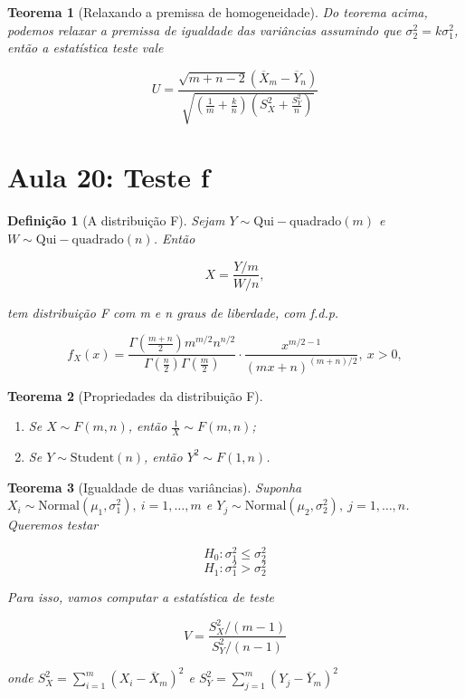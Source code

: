 \documentclass{article}
\newtheorem{theorem}{Teorema}
\newtheorem{definition}{Definição}
\begin{document}
\begin{theorem}[Relaxando a premissa de homogeneidade]
Do teorema acima, podemos relaxar a premissa de igualdade das variâncias assumindo que $\sigma_2^2 = k \sigma_1^2$, então a estatística teste vale

$$U = \frac{\sqrt{m + n - 2} (\overline{X}_m - \overline{Y}_n)}{\sqrt{(\frac{1}{m} + \frac{k}{n})(S_X^2 + \frac{S_Y^2}{n})}}$$
\end{theorem}

\section*{Aula 20: Teste f}\label{s20}
\begin{definition}[A distribuição F]
Sejam $Y \sim \mathrm{Qui-quadrado}(m)$ e $W \sim \mathrm{Qui-quadrado}(n)$. Então

$$X = \frac{Y / m}{W / n},$$

tem distribuição F com m e n graus de liberdade, com f.d.p.

$$f_X (x) = \frac{\Gamma(\frac{m + n}{2}) m^{m/2} n^{n/2}}{\Gamma(\frac{n}{2}) \Gamma(\frac{m}{2})} \cdot \frac{x^{m / 2 - 1}}{(mx + n)^{(m + n)/2}}, \ x > 0,$$
\end{definition}

\begin{theorem}[Propriedades da distribuição F]

\begin{enumerate}
    \item Se $X \sim F(m, n)$, então $\frac{1}{X} \sim F(m, n)$;
    
    \item Se $Y \sim \mathrm{Student}(n)$, então $Y^2 \sim F(1, n)$.
\end{enumerate}
\end{theorem}

\begin{theorem}[Igualdade de duas variâncias]
Suponha $X_i \sim \mathrm{Normal}(\mu_1, \sigma_1^2), \ i = 1, \ldots, m$ e $Y_j \sim \mathrm{Normal}(\mu_2, \sigma_2^2), \ j = 1, \ldots, n$. Queremos testar

$$H_0 : \sigma_1^2 \leq \sigma_2^2$$
$$H_1 : \sigma_1^2 > \sigma_2^2$$

Para isso, vamos computar a estatística de teste

$$V = \frac{S_X^2 / (m - 1)}{S_Y^2 / (n - 1)}$$

onde $S_X^2 = \sum_{i = 1}^m (X_i - \overline{X}_m)^2$ e $S_Y^2 = \sum_{j = 1}^m (Y_j - \overline{Y}_m)^2$
\end{theorem}
\end{document}

